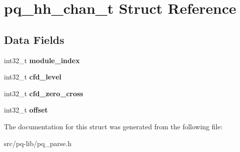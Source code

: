 \hypertarget{structpq__hh__chan__t}{}\section{pq\+\_\+hh\+\_\+chan\+\_\+t Struct Reference}
\label{structpq__hh__chan__t}
\subsection*{Data Fields}
\begin{DoxyCompactItemize}
\item 
\hypertarget{structpq__hh__chan__t_ac075ae9a072bce2faccd998acb4b0cc9}{}int32\+\_\+t {\bfseries module\+\_\+index}\label{structpq__hh__chan__t_ac075ae9a072bce2faccd998acb4b0cc9}

\item 
\hypertarget{structpq__hh__chan__t_adcc31607a2a96f93714b094b98b4f10e}{}int32\+\_\+t {\bfseries cfd\+\_\+level}\label{structpq__hh__chan__t_adcc31607a2a96f93714b094b98b4f10e}

\item 
\hypertarget{structpq__hh__chan__t_aeb33d0116c70bf16b694d7865a1a760b}{}int32\+\_\+t {\bfseries cfd\+\_\+zero\+\_\+cross}\label{structpq__hh__chan__t_aeb33d0116c70bf16b694d7865a1a760b}

\item 
\hypertarget{structpq__hh__chan__t_a586f13385fdccc75b3e3ef7a91c7937b}{}int32\+\_\+t {\bfseries offset}\label{structpq__hh__chan__t_a586f13385fdccc75b3e3ef7a91c7937b}

\end{DoxyCompactItemize}


The documentation for this struct was generated from the following file\+:\begin{DoxyCompactItemize}
\item 
src/pq-\/lib/pq\+\_\+parse.\+h\end{DoxyCompactItemize}
